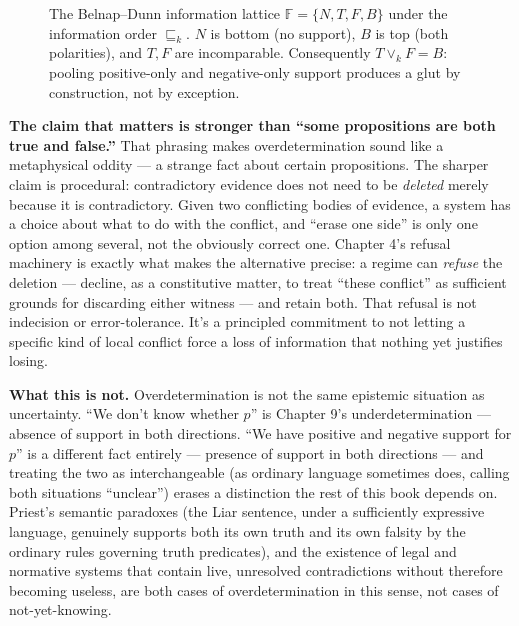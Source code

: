\begin{figure}[htbp]
\centering
{}
\caption{The Belnap--Dunn information lattice $\mathbb{F} = \{N,T,F,B\}$
under the information order $\sqsubseteq_k$. $N$ is bottom (no support),
$B$ is top (both polarities), and $T,F$ are incomparable. Consequently
$T \vee_k F = B$: pooling positive-only and negative-only support
produces a glut by construction, not by exception.}
\label{fig:belnap-lattice}
\end{figure}

\textbf{The claim that matters is stronger than ``some propositions are both
true and false.''} That phrasing makes overdetermination sound like a
metaphysical oddity --- a strange fact about certain propositions. The
sharper claim is procedural: contradictory evidence does not need to be
\emph{deleted} merely because it is contradictory. Given two conflicting
bodies of evidence, a system has a choice about what to do with the
conflict, and ``erase one side'' is only one option among several, not the
obviously correct one. Chapter 4's refusal machinery is exactly what
makes the alternative precise: a regime can \emph{refuse} the deletion ---
decline, as a constitutive matter, to treat ``these conflict'' as
sufficient grounds for discarding either witness --- and retain both. That
refusal is not indecision or error-tolerance. It's a principled
commitment to not letting a specific kind of local conflict force a loss
of information that nothing yet justifies losing.

\textbf{What this is not.} Overdetermination is not the same epistemic
situation as uncertainty. ``We don't know whether \(p\)'' is Chapter 9's
underdetermination --- absence of support in both directions.
``We have positive and negative support for \(p\)'' is a different fact
entirely --- presence of support in both directions --- and treating the two
as interchangeable (as ordinary language sometimes does, calling both
situations ``unclear'') erases a distinction the rest of this book depends
on. Priest's semantic paradoxes (the Liar sentence, under a sufficiently
expressive language, genuinely supports both its own truth and its own
falsity by the ordinary rules governing truth predicates), and the
existence of legal and normative systems that contain live, unresolved
contradictions without therefore becoming useless, are both cases of
overdetermination in this sense, not cases of not-yet-knowing.


